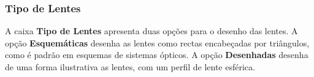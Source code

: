 \documentclass{scrartcl}
\begin{document}
\subsubsection{Tipo de Lentes} 

A caixa {\bf Tipo de Lentes} apresenta duas opções para o desenho das lentes. A opção {\bf Esquemáticas} desenha as lentes como rectas encabeçadas por triângulos, como é padrão em esquemas de sistemas ópticos. A opção {\bf Desenhadas} desenha de uma forma ilustrativa as lentes, com um perfil de lente esférica.
\par

\par
\end{document}
